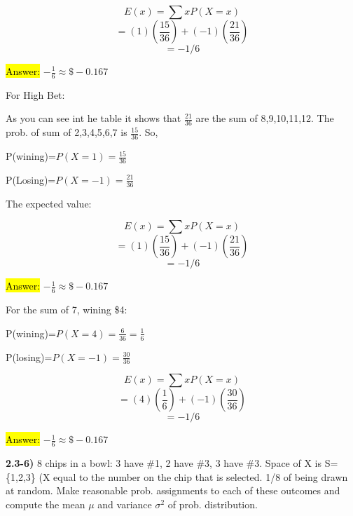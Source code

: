 \documentclass{article}
\begin{document}
$$E(x)=\sum xP(X=x)$$
$$=(1)(\frac{15}{36}) + (-1)(\frac{21}{36})$$
$$=-1/6$$

\vspace{2mm}

\hl{Answer:} $-\frac{1}{6} \approx \$-0.167$

\vspace{2mm}

For High Bet:

\vspace{2mm}

As you can see int he table it shows that $\frac{21}{36}$ are the sum of 8,9,10,11,12. The prob. of sum of 2,3,4,5,6,7 is $\frac{15}{36}$. So,

\vspace{2mm}

P(wining)=$P(X=1)=\frac{15}{36}$

\vspace{2mm}

P(Losing)=$P(X=-1)=\frac{21}{36}$

\vspace{2mm}

The expected value:

$$E(x)=\sum xP(X=x)$$
$$=(1)(\frac{15}{36}) + (-1)(\frac{21}{36})$$
$$=-1/6$$

\vspace{2mm}

\hl{Answer:} $-\frac{1}{6} \approx \$-0.167$

\vspace{2mm}

For the sum of 7, wining \$4:

\vspace{2mm}

P(wining)=$P(X=4)=\frac{6}{36}=\frac{1}{6}$

\vspace{2mm}

P(losing)=$P(X=-1)=\frac{30}{36}$

\vspace{2mm}

$$E(x)=\sum xP(X=x)$$
$$=(4)(\frac{1}{6}) + (-1)(\frac{30}{36})$$
$$=-1/6$$

\vspace{2mm}

\hl{Answer:} $-\frac{1}{6} \approx \$-0.167$



\newpage
\textbf{2.3-6)} 8 chips in a bowl: 3 have \#1, 2 have \#3, 3 have \#3. Space of X is S=\{1,2,3\} (X equal to the number on the chip that is selected. 1/8 of being drawn at random. Make reasonable prob. assignments to each of these outcomes and compute the mean $\mu$ and variance $\sigma^{2}$ of prob. distribution. 
\end{document}
